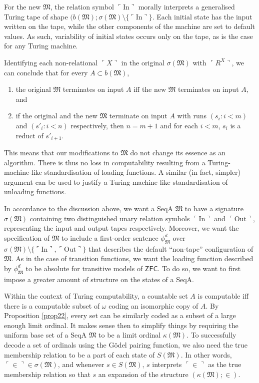 \documentclass[12pt]{article}
\numberwithin{equation}{section}
\begin{document}
For the new $\mathfrak{M}$, the relation symbol $\ulcorner \mathrm{In} \urcorner$ morally interprets a generalised Turing tape of shape $(b(\mathfrak{M}); \sigma(\mathfrak{M}) \setminus \{\ulcorner \mathrm{In} \urcorner\}$. Each initial state has the input written on the tape, while the other components of the machine are set to default values. As such, variability of initial states occurs only on the tape, as is the case for any Turing machine. 

Identifying each non-relational $\ulcorner X \urcorner$ in the original $\sigma(\mathfrak{M})$ with $\ulcorner R^X \urcorner$, we can conclude that for every $A \subset b(\mathfrak{M})$, 
\begin{enumerate}[label=(\arabic*)]
    \item the original $\mathfrak{M}$ terminates on input $A$ iff the new $\mathfrak{M}$ terminates on input $A$, and
    \item if the original and the new $\mathfrak{M}$ terminate on input $A$ with runs $(s_i : i < m)$ and $(s'_i : i < n)$ respectively, then $n = m + 1$ and for each $i < m$, $s_i$ is a reduct of $s'_{i+1}$.
\end{enumerate} 
This means that our modifications to $\mathfrak{M}$ do not change its essence as an algorithm. There is thus no loss in computability resulting from a Turing-machine-like standardisation of loading functions. A similar (in fact, simpler) argument can be used to justify a Turing-machine-like standardisation of unloading functions.

In accordance to the discussion above, we want a SeqA $\mathfrak{M}$ to have a signature $\sigma(\mathfrak{M})$ containing two distinguished unary relation symbols $\ulcorner \mathrm{In} \urcorner$ and $\ulcorner \mathrm{Out} \urcorner$, representing the input and output tapes respectively. Moreover, we want the specification of $\mathfrak{M}$ to include a first-order sentence $\phi^d_{\mathfrak{M}}$ over $\sigma(\mathfrak{M}) \setminus \{\ulcorner \mathrm{In} \urcorner, \ulcorner \mathrm{Out} \urcorner\}$ that describes the default ``non-tape'' configuration of $\mathfrak{M}$. As in the case of transition functions, we want the loading function described by $\phi^d_{\mathfrak{M}}$ to be absolute for transitive models of $\mathsf{ZFC}$. To do so, we want to first impose a greater amount of structure on the states of a SeqA.

Within the context of Turing computability, a countable set $A$ is computable iff there is a computable subset of $\omega$ coding an isomorphic copy of $A$. By Proposition \ref{prop22}, every set can be similarly coded as a subset of a large enough limit ordinal. It makes sense then to simplify things by requiring the uniform base set of a SeqA $\mathfrak{M}$ to be a limit ordinal $\kappa(\mathfrak{M})$. To successfully decode a set of ordinals using the G\"{o}del pairing function, we also need the true membership relation to be a part of each state of $S(\mathfrak{M})$. In other words, $\ulcorner \in \urcorner \in \sigma(\mathfrak{M})$, and whenever $s \in S(\mathfrak{M})$, $s$ interprets $\ulcorner \in \urcorner$ as the true membership relation so that $s$ an expansion of the structure $(\kappa(\mathfrak{M}); \in)$.
\end{document}
